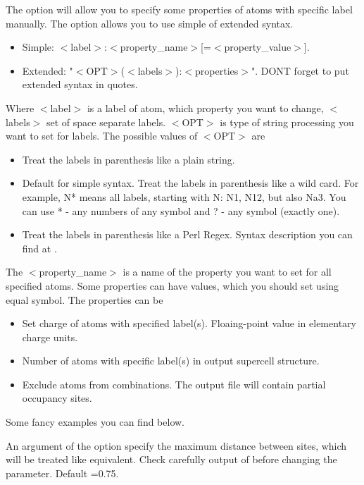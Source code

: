 \documentclass[a4paper,english]{article}
\begin{document}
\begin{Description}
\item[\OptArg{-p }{labels-properties}, \OptArg{\Dd property=}{labels-properties}]
      The option will allow you to specify some properties of atoms with specific label manually. The option allows you to use simple of extended syntax.
       \begin{itemize}
         \item Simple: $<$label$>$:$<$property\_name$>$[=$<$property\_value$>$].
         \item Extended: "$<$OPT$>$($<$labels$>$):{$<$properties$>$}". DONT forget to put extended syntax in quotes.
       \end{itemize}
       Where $<$label$>$ is a label of atom, which property you want to change, $<$labels$>$ set of space separate labels. $<$OPT$>$ is type of string processing you want to set for labels. The possible values of $<$OPT$>$ are
       \begin{itemize}
         \item[p] Treat the labels in parenthesis like a plain string. 
         \item[w, ""] Default for simple syntax. Treat the labels in parenthesis like a wild card. For example, N* means all labels, starting with N: N1, N12, but also Na3. You can use * - any numbers of any symbol and ? - any symbol (exactly one).
         \item[r] Treat the labels in parenthesis like a Perl Regex. Syntax description you can find at .
       \end{itemize}
       The $<$property\_name$>$ is a name of the property you want to set for all specified atoms. Some properties can have values, which you should set using equal symbol. The properties can be
       \begin{itemize}
         \item[c\Lbr charge\Rbr] Set charge of atoms with specified label(s). Floaing-point value in elementary charge units.
         \item[p\Lbr opulation\Rbr] Number of atoms with specific label(s) in output supercell structure.
         \item[\Lbr not\Rbr fixed] Exclude atoms from combinations. The output file will contain partial occupancy sites.
       \end{itemize}
       Some fancy examples you can find below.       
      
\item[\OptArg{-t }{tolerance}, \OptArg{\Dd tolerance=}{tolerance}]
      An argument of the option specify the maximum distance between sites, which will be treated like equivalent.     Check carefully output of  before changing the parameter. Default =0.75.


\end{Description}
\end{document}
